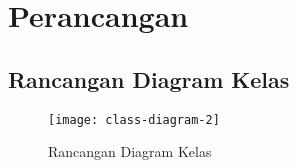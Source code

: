 \chapter{Perancangan}
\label{chap:perancangan}

\section{Rancangan Diagram Kelas}
\label{sec:rancangandiagramkelas}

\begin{figure}[h] 
    \centering  
    \texttt{[image: class-diagram-2]}  
    \caption{Rancangan Diagram Kelas}
    \label{fig:rancangandiagramkelas} 
\end{figure}